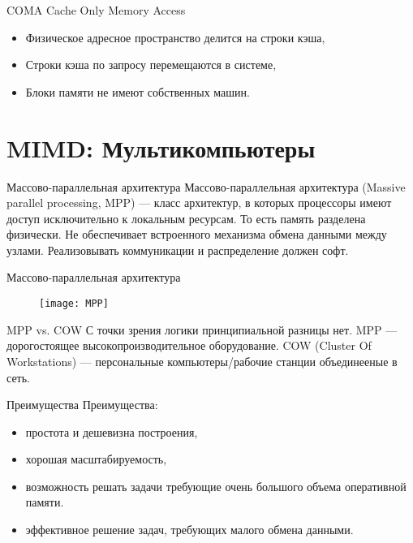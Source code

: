\begin{frame}{COMA}
\vfill
Cache Only Memory Access
\vfill
\begin{itemize}
    \item Физическое адресное пространство делится на строки кэша,
    \item Строки кэша по запросу перемещаются в системе,
    \item Блоки памяти не имеют собственных машин.
\end{itemize}
\end{frame}

\section{MIMD: Мультикомпьютеры}

\begin{frame}{Массово-параллельная архитектура}
Массово-параллельная архитектура (\abbr Massive parallel processing, MPP) --- класс архитектур, в которых процессоры имеют доступ исключительно к локальным ресурсам. То есть память разделена физически.
\vfill
Не обеспечивает встроенного механизма обмена данными между узлами. Реализовывать коммуникации и распределение должен софт.
\end{frame}

\begin{frame}{Массово-параллельная архитектура}
\begin{figure}[htpb]
    \centering
    \texttt{[image: MPP]}
\end{figure}
\end{frame}

\begin{frame}{MPP vs. COW}
\vfill
С точки зрения логики принципиальной разницы нет.
\vfill
MPP --- дорогостоящее высокопроизводительное оборудование.
\vfill
COW (Cluster Of Workstations) --- персональные компьютеры/рабочие станции
объединееные в сеть.
\end{frame}

\begin{frame}{Преимущества}
Преимущества:
\begin{itemize}
    \item простота и дешевизна построения,
    \item хорошая масштабируемость,
    \item возможность решать задачи требующие очень большого объема оперативной
    памяти.
    \item эффективное решение задач, требующих малого обмена данными.
\end{itemize}
\end{frame}

